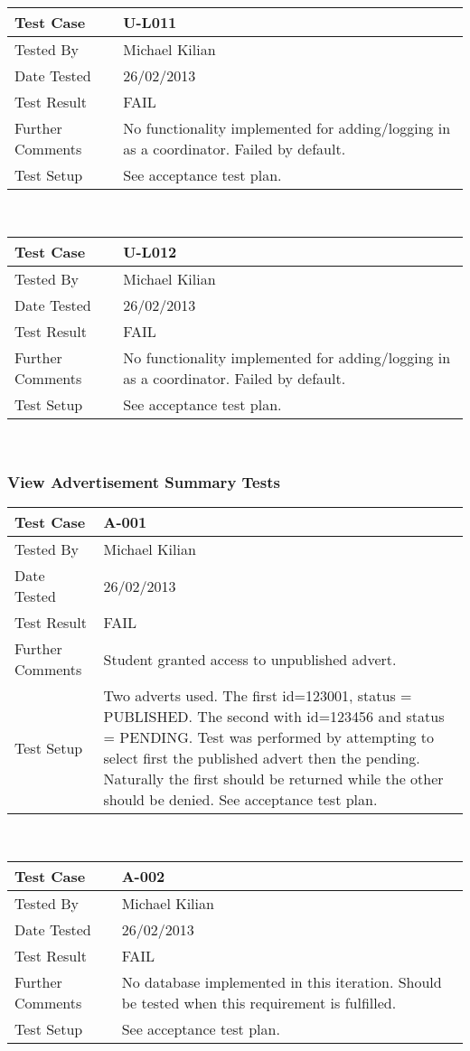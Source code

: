 \documentclass{l3deliverable}
\begin{document}
\begin{tabular}{lp{10cm}}
\hline 
\textbf{Test Case} & U-L011\tabularnewline
\hline 
\hline 
Tested By & Michael Kilian\tabularnewline
\hline 
Date Tested & 26/02/2013\tabularnewline
\hline 
Test Result & FAIL\tabularnewline
\hline
Further Comments &  No functionality implemented for adding/logging in as a coordinator. Failed by default. \tabularnewline
\hline
Test Setup &  See acceptance test plan. \tabularnewline
\hline
\end{tabular}\\

\begin{tabular}{lp{10cm}}
\hline 
\textbf{Test Case} & U-L012\tabularnewline
\hline 
\hline 
Tested By & Michael Kilian\tabularnewline
\hline 
Date Tested & 26/02/2013\tabularnewline
\hline 
Test Result & FAIL\tabularnewline
\hline
Further Comments &  No functionality implemented for adding/logging in as a coordinator. Failed by default. \tabularnewline
\hline
Test Setup &  See acceptance test plan. \tabularnewline
\hline
\end{tabular}\\


\subsubsection{View Advertisement Summary Tests}

\begin{tabular}{lp{10cm}}
\hline 
\textbf{Test Case} & A-001\tabularnewline
\hline 
\hline 
Tested By & Michael Kilian\tabularnewline
\hline 
Date Tested & 26/02/2013\tabularnewline
\hline 
Test Result & FAIL\tabularnewline
\hline
Further Comments &  Student granted access to unpublished advert. \tabularnewline
\hline
Test Setup &  Two adverts used. The first id=123001, status = PUBLISHED. The second with id=123456 and status = PENDING. Test was performed by attempting to select first the published advert then the pending. Naturally the first should be returned while the other should be denied. See acceptance test plan. \tabularnewline
\hline
\end{tabular}\\

\begin{tabular}{lp{10cm}}
\hline 
\textbf{Test Case} & A-002\tabularnewline
\hline 
\hline 
Tested By & Michael Kilian\tabularnewline
\hline 
Date Tested & 26/02/2013\tabularnewline
\hline 
Test Result & FAIL\tabularnewline
\hline
Further Comments &  No database implemented in this iteration. Should be tested when this requirement is fulfilled. \tabularnewline
\hline
Test Setup &  See acceptance test plan. \tabularnewline
\hline
\end{tabular}\\
\end{document}
